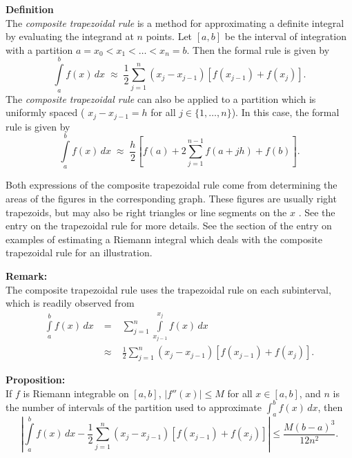 \documentclass[12pt]{article}
\begin{document}

\textbf{Definition}\\
The \emph{composite trapezoidal rule} is a method for approximating a definite integral by evaluating the integrand at $n$ points.  Let $[a,b]$ be the interval of integration with a partition $a=x_0<x_1<\ldots<x_n=b$.  Then the formal rule is given by
\[
\int\limits_a^b f(x)\,dx\;
\approx\;\frac{1}{2}\sum_{j=1}^n(x_j-x_{j-1})\left[f(x_{j-1})+f(x_j)\right].
\]
The \emph{composite trapezoidal rule} can also be applied to a partition which is uniformly spaced ( $x_j-x_{j-1}=h$ for all $j\in\{1,\ldots,n\}$).  In this case, the formal rule is given by 
\[
\int\limits_a^b f(x)\,dx\;
\approx\;\frac{h}{2}\left[ f(a) + 2\sum_{j=1}^{n-1}f(a+jh)+f(b)\right].
\]

Both expressions of the composite trapezoidal rule come from determining the areas of the figures in the corresponding graph.  These figures are usually right trapezoids, but may also be right triangles or line segments on the $x$ .  See the entry on the trapezoidal rule for more details.  See the section of the entry on examples of estimating a Riemann integral which deals with the composite trapezoidal rule for an illustration.

\textbf{Remark:}\\
The composite trapezoidal rule uses the trapezoidal rule on each subinterval, which is readily observed from
\begin{eqnarray*}
\int\limits_a^b f(x)\,dx\;&=&\;\sum_{j=1}^n\int\limits_{x_{j-1}}^{x_j} f(x)\,dx\;\\
&\approx&\;\frac{1}{2}\sum^n_{j=1}(x_j-x_{j-1})\left[f(x_{j-1})+f(x_j)\right].
\end{eqnarray*}

\textbf{Proposition:}\\
If $f$ is Riemann integrable on $[a,b]$, $|f''(x)| \le M$ for all $x \in [a,b]$, and $n$ is the number of intervals of the partition used to approximate $\int_a^b f(x) \, dx$, then
\[
\left| \int\limits_a^b f(x) \, dx - \frac{1}{2}\sum_{j=1}^n(x_j-x_{j-1})\left[f(x_{j-1})+f(x_j)\right]
\right| \le \frac{M(b-a)^3}{12n^2}.
\]
\end{document}
